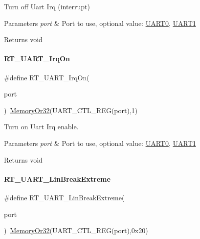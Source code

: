 Turn off Uart Irq (interrupt) 


\begin{DoxyParams}{Parameters}
{\em port} & Port to use, optional value\+: \mbox{\hyperlink{a00056_a0508661f121639ffdee7de2353a0def2}{U\+A\+R\+T0}}, \mbox{\hyperlink{a00056_a8d69bf04d07af4fbbab5a8bd291f65ff}{U\+A\+R\+T1}} \\
\hline
\end{DoxyParams}
\begin{DoxyReturn}{Returns}
void 
\end{DoxyReturn}
\mbox{\label{a00056_a5ed058b5d506df45c51358b8451550ad}} 
\paragraph{\texorpdfstring{R\+T\+\_\+\+U\+A\+R\+T\+\_\+\+Irq\+On}{RT\_UART\_IrqOn}}
{\footnotesize\ttfamily \#define R\+T\+\_\+\+U\+A\+R\+T\+\_\+\+Irq\+On(\begin{DoxyParamCaption}\item[{}]{port }\end{DoxyParamCaption})~\mbox{\hyperlink{a00020_a27874a97deab7cecdde5ddecf466e31e}{Memory\+Or32}}(U\+A\+R\+T\+\_\+\+C\+T\+L\+\_\+\+R\+EG(port),1)}



Turn on Uart Irq enable. 


\begin{DoxyParams}{Parameters}
{\em port} & Port to use, optional value\+: \mbox{\hyperlink{a00056_a0508661f121639ffdee7de2353a0def2}{U\+A\+R\+T0}}, \mbox{\hyperlink{a00056_a8d69bf04d07af4fbbab5a8bd291f65ff}{U\+A\+R\+T1}} \\
\hline
\end{DoxyParams}
\begin{DoxyReturn}{Returns}
void 
\end{DoxyReturn}
\mbox{\label{a00056_a9e7d98206f07485a3347bab6672a971c}} 
\paragraph{\texorpdfstring{R\+T\+\_\+\+U\+A\+R\+T\+\_\+\+Lin\+Break\+Extreme}{RT\_UART\_LinBreakExtreme}}
{\footnotesize\ttfamily \#define R\+T\+\_\+\+U\+A\+R\+T\+\_\+\+Lin\+Break\+Extreme(\begin{DoxyParamCaption}\item[{}]{port }\end{DoxyParamCaption})~\mbox{\hyperlink{a00020_a27874a97deab7cecdde5ddecf466e31e}{Memory\+Or32}}(U\+A\+R\+T\+\_\+\+C\+T\+L\+\_\+\+R\+EG(port),0x20)}



